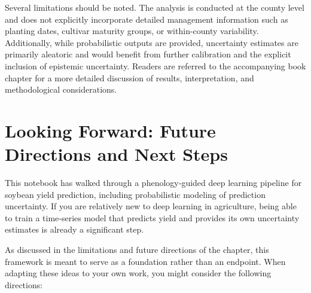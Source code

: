 \documentclass[
  letterpaper,
  DIV=11,
  numbers=noendperiod]{scrreprt}
\begin{document}
Several limitations should be noted. The analysis is conducted at the
county level and does not explicitly incorporate detailed management
information such as planting dates, cultivar maturity groups, or
within-county variability. Additionally, while probabilistic outputs are
provided, uncertainty estimates are primarily aleatoric and would
benefit from further calibration and the explicit inclusion of epistemic
uncertainty. Readers are referred to the accompanying book chapter for a
more detailed discussion of results, interpretation, and methodological
considerations.

\section{Looking Forward: Future Directions and Next
Steps}\label{looking-forward-future-directions-and-next-steps}

This notebook has walked through a phenology‑guided deep learning
pipeline for soybean yield prediction, including probabilistic modeling
of prediction uncertainty. If you are relatively new to deep learning in
agriculture, being able to train a time‑series model that predicts yield
and provides its own uncertainty estimates is already a significant
step.

As discussed in the limitations and future directions of the chapter,
this framework is meant to serve as a foundation rather than an
endpoint. When adapting these ideas to your own work, you might consider
the following directions:
\end{document}
